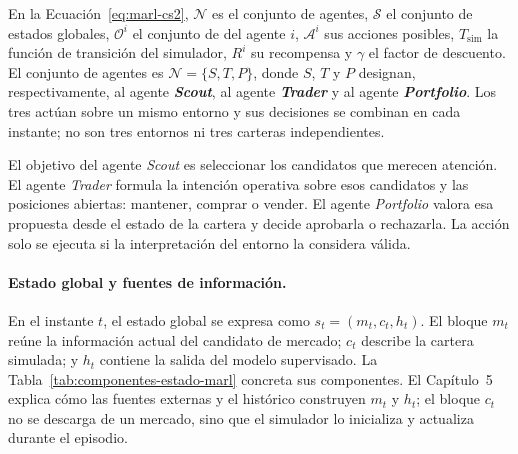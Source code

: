 En la Ecuación~\ref{eq:marl-cs2}, $\mathcal{N}$ es el conjunto de agentes, $\mathcal{S}$ el conjunto de estados globales, $\mathcal{O}^{i}$ el conjunto de  del agente $i$, $\mathcal{A}^{i}$ sus acciones posibles, $T_{\mathrm{sim}}$ la función de transición del simulador, $R^{i}$ su recompensa y $\gamma$ el factor de descuento. El conjunto de agentes es $\mathcal{N}=\{S,T,P\}$, donde $S$, $T$ y $P$ designan, respectivamente, al agente \textbf{\textit{Scout}}, al agente \textbf{\textit{Trader}} y al agente \textbf{\textit{Portfolio}}. Los tres actúan sobre un mismo entorno y sus decisiones se combinan en cada instante; no son tres entornos ni tres carteras independientes.

El objetivo del agente \textit{Scout} es seleccionar los candidatos que merecen atención. El agente \textit{Trader} formula la intención operativa sobre esos candidatos y las posiciones abiertas: mantener, comprar o vender. El agente \textit{Portfolio} valora esa propuesta desde el estado de la cartera y decide aprobarla o rechazarla. La acción solo se ejecuta si la interpretación del entorno la considera válida.

\paragraph{Estado global y fuentes de información.}
En el instante $t$, el estado global se expresa como $s_t=(m_t,c_t,h_t)$. El bloque $m_t$ reúne la información actual del candidato de mercado; $c_t$ describe la cartera simulada; y $h_t$ contiene la salida del modelo supervisado. La Tabla~\ref{tab:componentes-estado-marl} concreta sus componentes. El Capítulo~5 explica cómo las fuentes externas y el histórico construyen $m_t$ y $h_t$; el bloque $c_t$ no se descarga de un mercado, sino que el simulador lo inicializa y actualiza durante el episodio.

